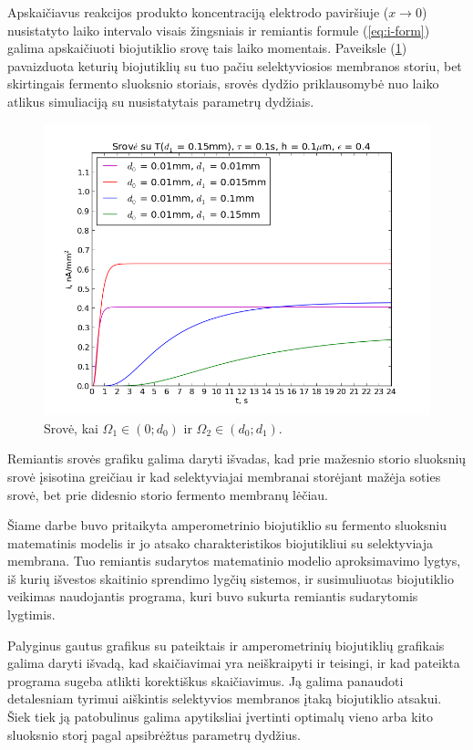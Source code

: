 \documentclass[12pt, a4paper, lithuanian]{article}
\begin{document}
 Apskaičiavus reakcijos produkto koncentraciją elektrodo paviršiuje ($x 
 \to 0$) nusistatyto laiko intervalo visais žingsniais ir remiantis formule
 (\ref{eq:i-form}) galima apskaičiuoti biojutiklio srovę tais laiko momentais.
 Paveiksle (\ref{img:I}) pavaizduota keturių biojutiklių su tuo pačiu
 selektyviosios membranos storiu, bet skirtingais fermento sluoksnio storiais,
 srovės dydžio priklausomybė nuo laiko atlikus simuliaciją su nusistatytais
 parametrų dydžiais.
 \begin{figure}[H]
     \centering
     \includegraphics[scale=0.5]{img/kurI}
     \caption{Srovė, kai $\Omega_1 \in (0; d_0)$ ir $\Omega_2 \in (d_0; d_1)$.}
     \label{img:I}
 \end{figure}

 Remiantis srovės grafiku galima daryti išvadas, kad prie mažesnio storio
 sluoksnių srovė įsisotina greičiau ir kad selektyviajai membranai storėjant
 mažėja soties srovė, bet prie didesnio storio fermento membranų lėčiau.


Šiame darbe buvo pritaikyta amperometrinio biojutiklio su fermento sluoksniu
matematinis modelis ir jo atsako charakteristikos biojutikliui su selektyviaja
membrana. Tuo remiantis sudarytos matematinio modelio aproksimavimo lygtys, iš
kurių išvestos skaitinio sprendimo lygčių sistemos, ir susimuliuotas
biojutiklio veikimas naudojantis programa, kuri buvo sukurta remiantis
sudarytomis lygtimis.

Palyginus gautus grafikus su pateiktais \cite{baronas2003influence} ir
\cite{baronas2009mathematical} amperometrinių
biojutiklių grafikais galima daryti
išvadą, kad skaičiavimai yra neiškraipyti ir teisingi, ir kad 
pateikta programa sugeba atlikti 
korektiškus skaičiavimus. Ją galima panaudoti detalesniam tyrimui aiškintis selektyvios membranos
įtaką biojutiklio atsakui. Šiek tiek ją patobulinus galima apytiksliai
įvertinti optimalų vieno arba kito sluoksnio storį pagal apsibrėžtus parametrų
dydžius.
\end{document}
